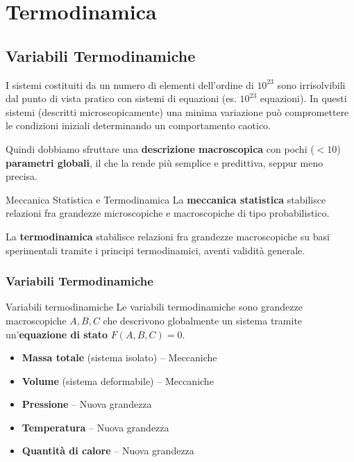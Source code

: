 \chapter{Termodinamica}
\section{Variabili Termodinamiche}

I sistemi costituiti da un numero di elementi dell'ordine di $10^{23}$ sono irrisolvibili dal punto di vista pratico con sistemi di equazioni (es. $10^{23}$ equazioni). In questi sistemi (descritti microscopicamente) una minima variazione può compromettere le condizioni iniziali determinando un comportamento caotico. 

\medskip
Quindi dobbiamo sfruttare una \textbf{descrizione macroscopica} con pochi ($< 10$) \textbf{parametri globali}, il che la rende più semplice e predittiva, seppur meno precisa.

\begin{definizione}{Meccanica Statistica e Termodinamica}
La \textbf{meccanica statistica} stabilisce relazioni fra grandezze microscopiche e macroscopiche di tipo probabilistico.

\medskip
La \textbf{termodinamica} stabilisce relazioni fra grandezze macroscopiche su basi sperimentali tramite i principi termodinamici, aventi validità generale.
\end{definizione}

\subsection{Variabili Termodinamiche}
\begin{definizione}{Variabili termodinamiche}
Le variabili termodinamiche sono grandezze macroscopiche $A, B, C$ che descrivono globalmente un sistema tramite un'\textbf{equazione di stato} $F(A,B,C) = 0$.
\end{definizione}

\begin{itemize}
    \item \textbf{Massa totale} (sistema isolato) -- Meccaniche
    \item \textbf{Volume} (sistema deformabile) -- Meccaniche
    \item \textbf{Pressione} -- Nuova grandezza
    \item \textbf{Temperatura} -- Nuova grandezza
    \item \textbf{Quantità di calore} -- Nuova grandezza
\end{itemize}

